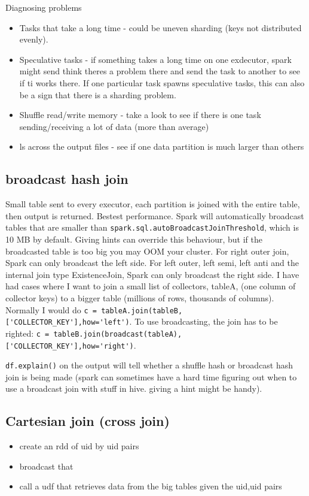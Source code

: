 \documentclass{article}
\begin{document}
    Diagnosing problems
    \begin{itemize}
        \item Tasks that take a long time - could be uneven sharding (keys not distributed evenly).
        \item Speculative tasks - if something takes a long time on one exdecutor, spark might send think theres a problem there and send the task to another to see if ti works there. If one particular task spawns speculative tasks, this can also be a sign that there is a sharding problem.
        \item Shuffle read/write memory - take a look to see if there is one task sending/receiving a lot of data (more than average)
        \item ls across the output files - see if one data partition is much larger than others
    \end{itemize}

    \subsection{broadcast hash join}
    Small table sent to every executor, each partition is joined with the entire table, then output is returned. Bestest performance. Spark will automatically broadcast tables that are smaller than \verb|spark.sql.autoBroadcastJoinThreshold|, which is 10 MB by default. Giving hints can override this behaviour, but if the broadcasted table is too big you may OOM your cluster.
    For right outer join, Spark can only broadcast the left side. For left outer, left semi, left anti and the internal join type ExistenceJoin, Spark can only broadcast the right side. I have had cases where I want to join a small list of collectors, tableA, (one column of collector keys) to a bigger table (millions of rows, thousands of columns). Normally I would do \verb|c = tableA.join(tableB,['COLLECTOR_KEY'],how='left')|. To use broadcasting, the join has to be righted: \verb|c = tableB.join(broadcast(tableA),['COLLECTOR_KEY'],how='right')|. 

    \verb|df.explain()| on the output will tell whether a shuffle hash or broadcast hash join is being made
    (spark can sometimes have a hard time figuring out when to use a broadcast join with stuff in hive. giving a hint might be handy).

\subsection{Cartesian join (cross join)}
\begin{itemize}
\item create an rdd of uid by uid pairs
\item broadcast that
\item call a udf that retrieves data from the big tables given the uid,uid pairs
\end{itemize}
\end{document}
